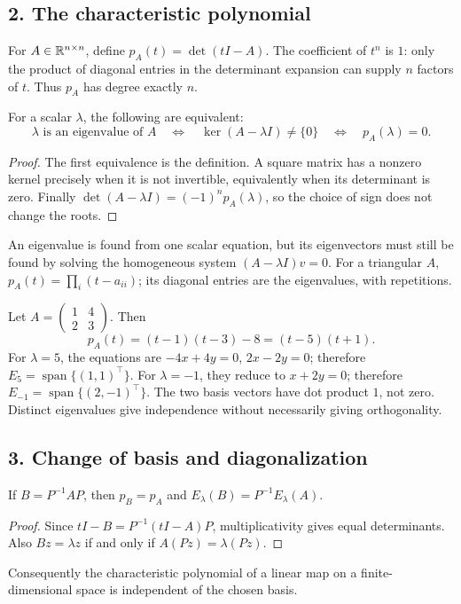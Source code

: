 \subsection*{2. The characteristic polynomial}
For \(A\in\mathbb R^{n\times n}\), define \(p_A(t)=\det(tI-A)\).
The coefficient of \(t^n\) is \(1\): only the product of diagonal entries
in the determinant expansion can supply \(n\) factors of \(t\).
Thus \(p_A\) has degree exactly \(n\).

\begin{theorem}
For a scalar \(\lambda\), the following are equivalent:
\[
 \lambda\text{ is an eigenvalue of }A
 \quad\Longleftrightarrow\quad
 \ker(A-\lambda I)\ne\{0\}
 \quad\Longleftrightarrow\quad p_A(\lambda)=0.
\]
\end{theorem}
\begin{proof}
The first equivalence is the definition. A square matrix has a nonzero
kernel precisely when it is not invertible, equivalently when its
determinant is zero. Finally
\(\det(A-\lambda I)=(-1)^n p_A(\lambda)\), so the choice of sign does
not change the roots.
\end{proof}

An eigenvalue is found from one scalar equation, but its eigenvectors
must still be found by solving the homogeneous system
\((A-\lambda I)v=0\). For a triangular \(A\),
\(p_A(t)=\prod_i(t-a_{ii})\); its diagonal entries are the eigenvalues,
with repetitions.

\begin{example}
Let \(A=\begin{pmatrix}1&4\\2&3\end{pmatrix}\). Then
\[
 p_A(t)=(t-1)(t-3)-8=(t-5)(t+1).
\]
For \(\lambda=5\), the equations are \(-4x+4y=0\), \(2x-2y=0\);
therefore \(E_5=\operatorname{span}\{(1,1)^\top\}\).
For \(\lambda=-1\), they reduce to \(x+2y=0\);
therefore \(E_{-1}=\operatorname{span}\{(2,-1)^\top\}\).
The two basis vectors have dot product \(1\), not zero. Distinct
eigenvalues give independence without necessarily giving orthogonality.
\end{example}

\subsection*{3. Change of basis and diagonalization}
\begin{proposition}[Similarity]
If \(B=P^{-1}AP\), then \(p_B=p_A\) and
\(E_\lambda(B)=P^{-1}E_\lambda(A)\).
\end{proposition}
\begin{proof}
Since \(tI-B=P^{-1}(tI-A)P\), multiplicativity gives equal determinants.
Also \(Bz=\lambda z\) if and only if \(A(Pz)=\lambda(Pz)\).
\end{proof}
Consequently the characteristic polynomial of a linear map on a
finite-dimensional space is independent of the chosen basis.

